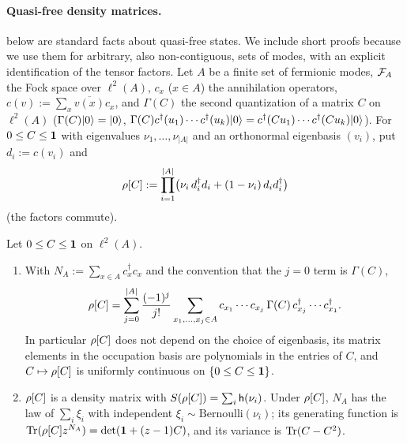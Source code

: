 \paragraph{Quasi-free density matrices.}
 below are standard facts about quasi-free states.  We include short
proofs because we use them for arbitrary, also non-contiguous, sets of modes, with an explicit
identification of the tensor factors.
Let $A$ be a finite set of fermionic modes, $\mathcal{F}_A$ the Fock space over $\ell^2(A)$, $c_x$ ($x\in A$) the
annihilation operators, $c(v):=\sum_x\overline{v(x)}c_x$, and $\Gamma(C)$ the second quantization of a
matrix $C$ on $\ell^2(A)$ ($\Gamma(C)|0\rangle=|0\rangle$,
$\Gamma(C)c^\dagger(u_1)\cdots c^\dagger(u_k)|0\rangle=c^\dagger(Cu_1)\cdots c^\dagger(Cu_k)|0\rangle$).  For
$0\le C\le\mathbf{1}$ with eigenvalues $\nu_1,\dots,\nu_{|A|}$ and an orthonormal eigenbasis $(v_i)$, put
$d_i:=c(v_i)$ and
\begin{equation}\label{eq:main-rhoC}
  \rho[C]:=\prod_{i=1}^{|A|}\bigl(\nu_i\,d_i^\dagger d_i+(1-\nu_i)\,d_id_i^\dagger\bigr)
\end{equation}
(the factors commute).

\begin{lemma}\label{lem:quasifree}
Let $0\le C\le\mathbf{1}$ on $\ell^2(A)$.
\begin{enumerate}[label=(\alph*)]
\item With $N_A:=\sum_{x\in A}c_x^\dagger c_x$ and the convention that the $j=0$ term is $\Gamma(C)$,
\begin{equation}\label{eq:main-rhoformula}
  \rho[C]=\sum_{j=0}^{|A|}\frac{(-1)^j}{j!}\sum_{x_1,\dots,x_j\in A}c_{x_1}\cdots c_{x_j}\,\Gamma(C)\,
  c^\dagger_{x_j}\cdots c^\dagger_{x_1}.
\end{equation}
In particular $\rho[C]$ does not depend on the choice of eigenbasis, its matrix elements in the
occupation basis are polynomials in the entries of $C$, and $C\mapsto\rho[C]$ is uniformly continuous
on $\{0\le C\le\mathbf{1}\}$.
\item $\rho[C]$ is a density matrix with $S(\rho[C])=\sum_i\mathsf{h}(\nu_i)$.  Under $\rho[C]$, $N_A$ has
the law of $\sum_i\xi_i$ with independent $\xi_i\sim\mathrm{Bernoulli}(\nu_i)$; its generating function is
$\operatorname{Tr}(\rho[C]z^{N_A})=\det(\mathbf{1}+(z-1)C)$, and its variance is $\operatorname{Tr}(C-C^2)$.
\end{enumerate}
\end{lemma}

